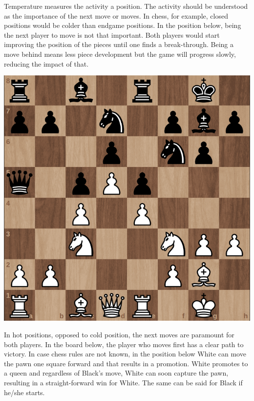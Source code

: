 Temperature measures the activity a position. The activity should be understood as the importance of the next move or moves. In chess, for example, closed positions would be colder than endgame positions. In the position below, being the next player to move is not that important. Both players would start improving the position of the pieces until one finds a break-through. Being a move behind means less piece development but the game will progress slowly, reducing the impact of that.

\begin{center}
\includegraphics[scale=0.15]{images/chess_cold} 
\end{center}

In hot positions, opposed to cold position, the next moves are paramount for both players. In the board below, the player who moves first has a clear path to victory. In case chess rules are not known, in the position below White can move the pawn one square forward and that results in a promotion. White promotes to a queen and regardless of Black's move, White can soon capture the pawn, resulting in a straight-forward win for White. The same can be said for Black if he/she starts.

